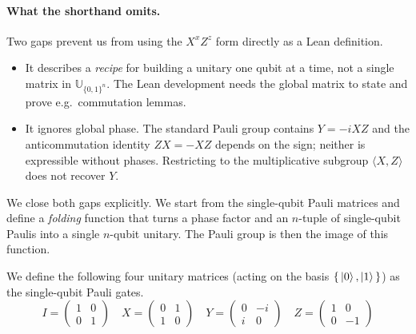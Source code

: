 \paragraph{What the shorthand omits.} Two gaps prevent us from using the $X^x
Z^z$ form directly as a Lean definition.
\begin{itemize}
    \item It describes a \emph{recipe} for building a unitary one qubit at a
    time, not a single matrix in $\mathbb{U}_{\{0,1\}^n}$. The Lean development
    needs the global matrix to state and prove e.g.\ commutation lemmas.
    \item It ignores global phase. The standard Pauli group contains $Y = -iXZ$
    and the anticommutation identity $ZX = -XZ$ depends on the sign; neither is
    expressible without phases. Restricting to the multiplicative subgroup
    $\langle X, Z\rangle$ does not recover $Y$.
\end{itemize}
We close both gaps explicitly. We start from the single-qubit Pauli matrices and
define a \emph{folding} function that turns a phase factor and an $n$-tuple of
single-qubit Paulis into a single $n$-qubit unitary. The Pauli group is then the
image of this function.
\begin{definition}
    \label{def:pauli-1}
    We define the following four unitary matrices (acting on the basis
    $\set{\ket{0}, \ket{1}}$) as the single-qubit Pauli gates.
    $$I = \begin{pmatrix}
    1 & 0 \\ 0 & 1
 \end{pmatrix}\quad X = \begin{pmatrix}
    0 & 1 \\ 1 & 0
\end{pmatrix}\quad Y = \begin{pmatrix}
    0 & -i \\ i & 0
\end{pmatrix} \quad Z = \begin{pmatrix}
    1 & 0 \\ 0 & -1
\end{pmatrix}$$
\end{definition}
%

